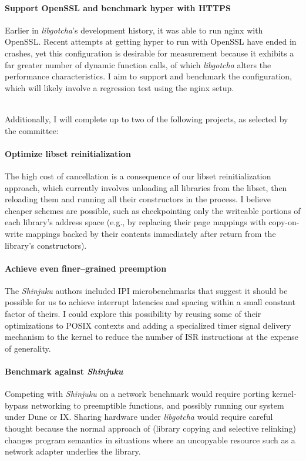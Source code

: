 \documentclass[12pt,letterpaper,openright]{report}
\begin{document}
\paragraph{Support OpenSSL and benchmark hyper with HTTPS}
Earlier in \textit{libgotcha}'s development history, it was able to run nginx with
OpenSSL.  Recent attempts at getting hyper to run with OpenSSL have ended in crashes,
yet this configuration is desirable for measurement because it exhibits a far greater
number of dynamic function calls, of which \textit{libgotcha} alters the performance
characteristics.  I aim to support and benchmark the configuration, which will likely
involve a regression test using the nginx setup.

\hfill \\
\noindent
Additionally, I will complete up to two of the following projects, as selected by the
committee:

\paragraph{Optimize libset reinitialization}
The high cost of cancellation is a consequence of our libset reinitialization
approach, which currently involves unloading all libraries from the libset, then
reloading them and running all their constructors in the process.  I believe cheaper
schemes are possible, such as checkpointing only the writeable portions of each
library's address space (e.g., by replacing their page mappings with copy-on-write
mappings backed by their contents immediately after return from the library's
constructors).

\paragraph{Achieve even finer--grained preemption}
The \textit{Shinjuku} authors included IPI microbenchmarks that suggest it should be
possible for us to achieve interrupt latencies and spacing within a small constant
factor of theirs.  I could explore this possibility by reusing some of their
optimizations to POSIX contexts and adding a specialized timer signal delivery
mechanism to the kernel to reduce the number of ISR instructions at the expense of
generality.

\paragraph{Benchmark against \textit{Shinjuku}}
Competing with \textit{Shinjuku} on a network benchmark would require porting
kernel-bypass networking to preemptible functions, and possibly running our system
under Dune or IX.  Sharing hardware under \textit{libgotcha} would require careful
thought because the normal approach of (library copying and selective relinking)
changes program semantics in situations where an uncopyable resource such as a
network adapter underlies the library.
\end{document}
